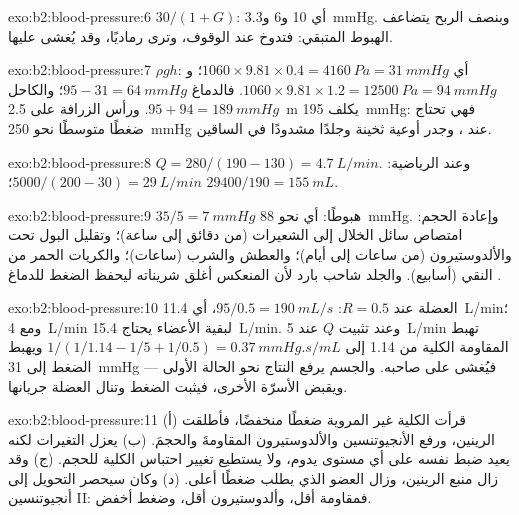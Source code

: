 \begin{solution}{exo:b2:blood-pressure:6}
$30/(1 + G)$: أي 10 و6 و\qty{3.3}{mmHg}. وبنصف الربح يتضاعف
الهبوط المتبقي: فتدوخ عند الوقوف، وترى رماديًا، وقد
يُغشى عليها.
\end{solution}

\begin{solution}{exo:b2:blood-pressure:7}
$\rho g h$: أي $1060\times 9.81\times 0.4 = \qty{4160}{Pa} =
\qty{31}{mmHg}$؛ و$1060\times 9.81\times 1.2 = \qty{12500}{Pa} =
\qty{94}{mmHg}$. فالدماغ $95 - 31 = \qty{64}{mmHg}$؛ والكاحل $95 + 94 =
\qty{189}{mmHg}$. ورأس الزرافة على \qty{2.5}{m} يكلف
\qty{195}{mmHg}: فهي تحتاج ضغطًا متوسطًا نحو \qty{250}{mmHg} عند
، وجدر أوعية ثخينة وجلدًا مشدودًا في الساقين.
\end{solution}

\begin{solution}{exo:b2:blood-pressure:8}
$Q = 280/(190 - 130) = \qty{4.7}{L/min}$. وعند الرياضية: $5000/(200 - 30) =
\qty{29}{L/min}$؛  $\num{29400}/190 = \qty{155}{mL}$.
\end{solution}

\begin{solution}{exo:b2:blood-pressure:9}
$35/5 = \qty{7}{mmHg}$ هبوطًا: أي نحو \qty{88}{mmHg}. وإعادة
الحجم: امتصاص سائل الخلال إلى الشعيرات
(من دقائق إلى ساعة)؛ وتقليل البول تحت 
والألدوستيرون (من ساعات إلى أيام)؛ والعطش والشرب (ساعات)؛
والكريات الحمر من النقي (أسابيع). والجلد شاحب بارد لأن
المنعكس أغلق شريناته ليحفظ الضغط للدماغ
.
\end{solution}

\begin{solution}{exo:b2:blood-pressure:10}
العضلة عند $R = 0.5$: $95/0.5 = \qty{190}{mL/s}$، أي \qty{11.4}{L/min}؛
ومع \qty{4}{L/min} لبقية الأعضاء يحتاج 
\qty{15.4}{L/min}. وعند تثبيت $Q$ عند \qty{5}{L/min} تهبط المقاومة
الكلية من 1.14 إلى $1/(1/1.14 - 1/5 + 1/0.5) =
\qty{0.37}{mmHg.s/mL}$ ويهبط الضغط إلى \qty{31}{mmHg} ---
فيُغشى على صاحبه. والجسم يرفع النتاج نحو الحالة الأولى
ويقبض الأسرّة الأخرى، فيثبت الضغط وتنال
العضلة جريانها.
\end{solution}

\begin{solution}{exo:b2:blood-pressure:11}
(أ) قرأت الكلية غير المروية ضغطًا منخفضًا، فأطلقت الرينين،
ورفع الأنجيوتنسين والألدوستيرون المقاومةَ والحجمَ.
(ب)  يعزل التغيرات لكنه يعيد ضبط نفسه على أي
مستوى يدوم، ولا يستطيع تغيير احتباس الكلية للحجم.
(ج) وقد زال منبع الرينين، وزال العضو الذي يطلب ضغطًا أعلى.
(د) وكان سيحصر التحويل إلى أنجيوتنسين II: فمقاومة أقل،
وألدوستيرون أقل، وضغط أخفض.
\end{solution}

